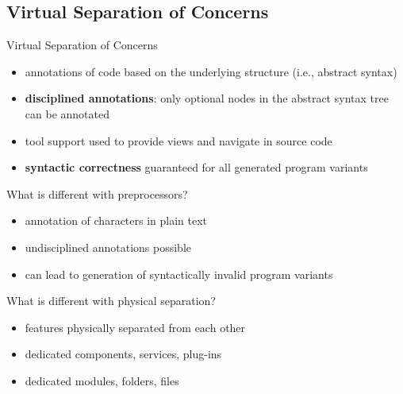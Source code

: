 \subsection{Virtual Separation of Concerns}
\begin{frame}{\myframetitle\mysource{\virtualseparation}}
	\begin{mycolumns}
		\begin{definition}{Virtual Separation of Concerns}
			\begin{itemize}
				\item annotations of code based on the underlying structure (i.e., abstract syntax)
				\item \textbf{disciplined annotations}: only optional nodes in the abstract syntax tree can be annotated
				\item tool support used to provide views and navigate in source code
				\item \textbf{syntactic correctness} guaranteed for all generated program variants
			\end{itemize}
		\end{definition}
	\mynextcolumn
		\begin{note}{What is different with preprocessors?}
			\begin{itemize}
				\item annotation of characters in plain text
				\item undisciplined annotations possible
				\item can lead to generation of syntactically invalid program variants
			\end{itemize}
		\end{note}
		\begin{note}{What is different with physical separation?}
			\begin{itemize}
				\item features physically separated from each other
				\item dedicated components, services, plug-ins\\\mysource{\lecturemodules}
				\item dedicated modules, folders, files \mysource{\lecturelanguages}
			\end{itemize}
		\end{note}
	\end{mycolumns}
\end{frame}


